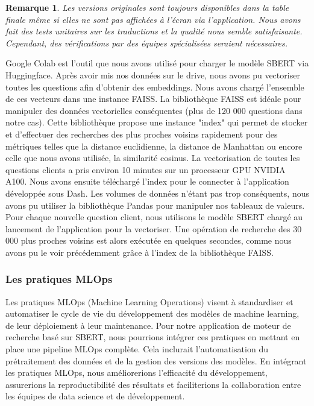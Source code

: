 \documentclass[12pt]{article}
\newtheorem{rmq}{Remarque}
\theoremstyle{definition}
\begin{document}
\begin{rmq}
	 Les versions originales sont toujours disponibles dans la table finale même si elles ne sont pas affichées à l’écran via l’application. Nous avons fait des tests unitaires sur les traductions et la qualité nous semble satisfaisante. Cependant, des vérifications par des équipes spécialisées seraient nécessaires.
\end{rmq}

Google Colab est l’outil que nous avons utilisé pour charger le modèle SBERT via Huggingface. Après avoir mis nos données sur le drive, nous avons pu vectoriser toutes les questions afin d'obtenir des embeddings. Nous avons chargé l’ensemble de ces vecteurs dans une instance FAISS. La bibliothèque FAISS est idéale pour manipuler des données vectorielles conséquentes (plus de 120 000 questions dans notre cas). Cette bibliothèque propose une instance "index" qui permet de stocker et d’effectuer des recherches des plus proches voisins rapidement pour des métriques telles que la distance euclidienne, la distance de Manhattan ou encore celle que nous avons utilisée, la similarité cosinus. La vectorisation de toutes les questions clients a pris environ 10 minutes sur un processeur GPU NVIDIA A100. Nous avons ensuite téléchargé l'index pour le connecter à l’application développée sous Dash. Les volumes de données n’étant pas trop conséquents, nous avons pu utiliser la bibliothèque Pandas pour manipuler nos tableaux de valeurs. Pour chaque nouvelle question client, nous utilisons le modèle SBERT chargé au lancement de l’application pour la vectoriser. Une opération de recherche des 30 000 plus proches voisins est alors exécutée en quelques secondes, comme nous avons pu le voir précédemment grâce à l’index de la bibliothèque FAISS.

\subsubsection{Les pratiques MLOps }

Les pratiques MLOps (Machine Learning Operations) visent à standardiser et automatiser le cycle de vie du développement des modèles de machine learning, de leur déploiement à leur maintenance. Pour notre application de moteur de recherche basé sur SBERT, nous pourrions intégrer ces pratiques en mettant en place une pipeline MLOps complète. Cela inclurait l'automatisation du prétraitement des données et de la gestion des versions des modèles. En intégrant les pratiques MLOps, nous améliorerions l'efficacité du développement, assurerions la reproductibilité des résultats et faciliterions la collaboration entre les équipes de data science et de développement.
\end{document}
